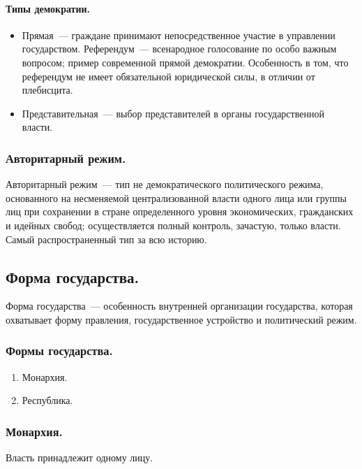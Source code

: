 \documentclass{article}
\begin{document}
	\paragraph{Типы демократии.}
	\begin{itemize}
		\item Прямая~--- граждане принимают непосредственное участие в управлении государством. Референдум~--- всенародное голосование по особо важным вопросом; пример современной прямой демократии. Особенность в том, что референдум не имеет обязательной юридической силы, в отличии от плебисцита.
		\item Представительная~--- выбор представителей в органы государственной власти.
	\end{itemize}
	\subsubsection{Авторитарный режим.}
	\begin{definition}
		Авторитарный режим~--- тип не демократического политического режима, основанного на несменяемой централизованной власти одного лица или группы лиц при сохранении в стране определенного уровня экономических, гражданских и идейных свобод; осуществляется полный контроль, зачастую, только власти. Самый распространенный тип за всю историю.
	\end{definition}
	\subsection{Форма государства.}
	\begin{definition}
		Форма государства~--- особенность внутренней организации государства, которая охватывает форму правления, государственное устройство и политический режим.
	\end{definition}
	\subsubsection{Формы государства.}
	\begin{enumerate}
		\item Монархия.
		\item Республика.
	\end{enumerate}
	\subsubsection{Монархия.}
	\begin{definition}[Монархия]
		Власть принадлежит одному лицу.
	\end{definition}
\end{document}
